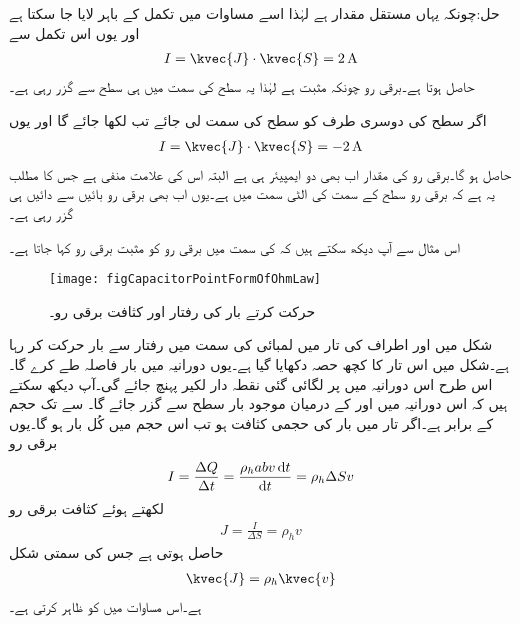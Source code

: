 حل:چونکہ  یہاں  مستقل مقدار ہے لہٰذا اسے مساوات  میں تکمل کے باہر لایا جا سکتا ہے اور یوں اس تکمل سے
\begin{align*}
I=\kvec{J} \cdot \kvec{S}= \SI{2}{\ampere}
\end{align*} 
حاصل ہوتا ہے۔برقی رو چونکہ مثبت ہے لہٰذا یہ سطح کی سمت میں ہی سطح سے گزر رہی ہے۔

اگر سطح کی دوسری طرف کو سطح کی سمت لی جائے تب  لکھا جائے گا اور یوں
\begin{align*}
I=\kvec{J} \cdot \kvec{S}= \SI{-2}{\ampere}
\end{align*} 
حاصل ہو گا۔برقی رو کی مقدار اب بھی دو ایمپیئر ہی ہے البتہ اس کی علامت منفی ہے جس کا مطلب یہ ہے کہ برقی رو سطح کے سمت کی الٹی سمت میں ہے۔یوں اب بھی برقی رو بائیں سے دائیں ہی  گزر رہی ہے۔

%

اس مثال سے آپ دیکھ سکتے ہیں کہ  کی سمت میں برقی رو کو مثبت برقی رو کہا جاتا ہے۔
\begin{figure}
\centering
\texttt{[image: figCapacitorPointFormOfOhmLaw]}
\caption{حرکت کرتے بار کی رفتار اور کثافت برقی رو۔}
\label{شکل_کپیسٹر_حرکت_کرتا_بار_اور_کثافت_برقی_رو}
\end{figure}

شکل  میں  اور  اطراف کی تار میں لمبائی کی سمت میں  رفتار سے بار حرکت کر رہا ہے۔شکل میں اس تار کا کچھ حصہ دکھایا گیا ہے۔یوں  دورانیہ میں بار  فاصلہ طے کرے گا۔اس طرح اس دورانیہ میں  پر لگائی گئی نقطہ دار لکیر  پہنچ جائے گی۔آپ دیکھ سکتے ہیں کہ اس دورانیہ میں  اور  کے درمیان موجود بار سطح  سے گزر جائے گا۔ سے  تک حجم  کے برابر ہے۔اگر تار میں بار کی حجمی کثافت  ہو تب اس حجم میں  کُل بار  ہو گا۔یوں برقی رو
\begin{align*}
I=\frac{\Delta Q}{\Delta t}=\frac{\rho_h a b v \dif t}{\dif t}=\rho_h \Delta S v
\end{align*}
لکھتے ہوئے  کثافت برقی رو
\begin{align*}
J=\frac{I}{\Delta S}=\rho_h v
\end{align*}
حاصل ہوتی ہے جس کی سمتی شکل
\begin{align}\label{مساوات_کپیسٹر_کثافت_رو_مساوی_کثافت_بار_ضرب_رفتار}
\kvec{J}=\rho_h \kvec{v}
\end{align}
ہے۔اس مساوات میں   کو ظاہر کرتی ہے۔

